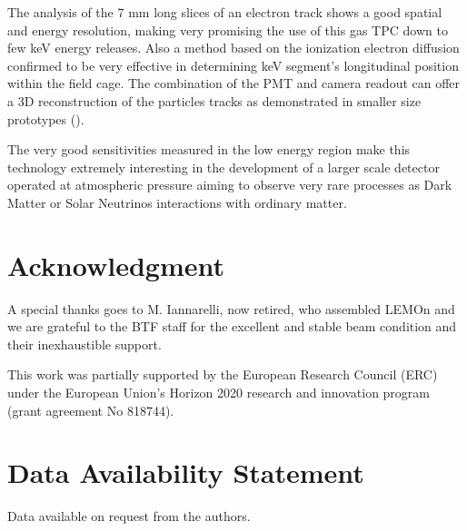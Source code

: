 \documentclass[review]{elsarticle}
\begin{document}
The analysis of the 7 mm long slices of an electron track shows a  good spatial  and  energy resolution,  making very promising the use of this  gas TPC down to few keV energy releases. Also a method based on the ionization electron diffusion confirmed to be very effective in determining keV segment's longitudinal position within the field cage. The combination of the PMT and camera readout can offer a 3D reconstruction of the particles tracks as demonstrated in smaller size prototypes (\cite{bib:jinst_orange2}).

The very good sensitivities measured in the low energy region make this technology extremely interesting in the development of a larger scale detector operated at atmospheric pressure aiming to observe very rare processes as Dark Matter or Solar Neutrinos interactions with ordinary matter.
  

\section*{Acknowledgment}
A special thanks goes to M. Iannarelli, now retired, who assembled LEMOn and we are grateful to the BTF staff for the excellent and stable beam condition and their inexhaustible support.

This work was partially supported by the European Research Council (ERC) under the European Union’s Horizon 2020 research and innovation program (grant agreement No 818744).

\section*{Data Availability Statement}
Data available on request from the authors.


\nocite{*}

\end{document}
